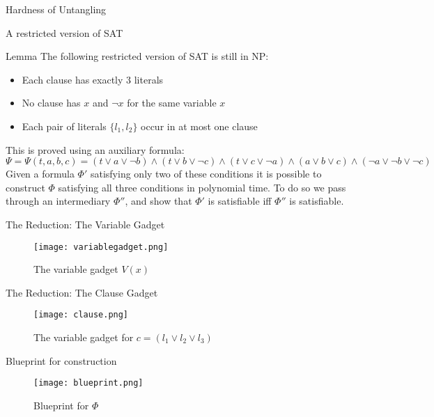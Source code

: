 \documentclass{beamer}
\begin{document}
\begin{section}{Hardness of Untangling}
    \begin{frame}{A restricted version of SAT}
        \begin{block}{Lemma}
            The following restricted version of SAT is still in NP:
            \begin{itemize}
                \item Each clause has exactly 3 literals
                \item No clause has $x$ and $\neg x$ for the same variable $x$
                \item Each pair of literals $\{l_1,l_2\}$ occur in at most one clause
            \end{itemize}{}
            \end{block}{}
            This is proved using an auxiliary formula: $\Psi= \Psi(t,a,b,c)=(t\lor a \lor \neg b)\land (t \lor b \lor \neg c)\land (t \lor c \lor \neg a)\land (a \lor b \lor c) \land (\neg a \lor \neg b \lor \neg c)$
            \newline
            \newline
            Given a formula $\Phi'$ satisfying only two of these conditions it is possible to construct $\Phi$ satisfying all three conditions in polynomial time. 
            \newline
            \newline
            To do so we pass through an intermediary $\Phi''$, and show that $\Phi'$ is satisfiable iff $\Phi''$ is satisfiable.  
    \end{frame}{}
    
    \begin{frame}{The Reduction: The Variable Gadget}
        
        \begin{figure}
            \texttt{[image: variablegadget.png]}
            \caption{The variable gadget $V(x)$}
        \end{figure}
        
    \end{frame}{}
    
    \begin{frame}{The Reduction: The Clause Gadget}
        \begin{figure}
            \texttt{[image: clause.png]}
            \caption{The variable gadget for $c=(l_1\lor l_2 \lor l_3)$}
        \end{figure}
    \end{frame}
    
    \begin{frame}{Blueprint for construction}
        \begin{figure}
            \texttt{[image: blueprint.png]}
            \caption{Blueprint for $\Phi$}
        \end{figure}
    \end{frame}{}
    

\end{section}
\end{document}
